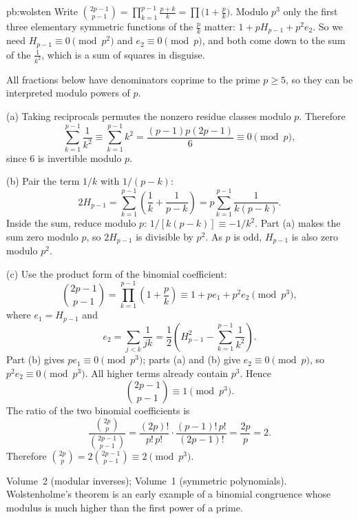 \begin{solution}{pb:wolsten}
\idea Write $\binom{2p-1}{p-1}=\prod_{k=1}^{p-1}\frac{p+k}k=\prod\bigl(1+\frac pk\bigr)$. Modulo $p^3$ only the first three elementary symmetric
functions of the $\frac pk$ matter: $1+pH_{p-1}+p^2e_2$. So we need $H_{p-1}\equiv0\pmod{p^2}$ and $e_2\equiv0\pmod p$, and both come down
to the sum of the $\frac1{k^2}$, which is a sum of squares in disguise.

\writeup All fractions below have denominators coprime to the prime $p\ge5$, so they can be interpreted modulo powers of $p$.

(a) Taking reciprocals permutes the nonzero residue classes modulo $p$. Therefore
\[
\sum_{k=1}^{p-1}\frac1{k^2}
\equiv\sum_{k=1}^{p-1}k^2
=\frac{(p-1)p(2p-1)}6
\equiv0\pmod p,
\]
since $6$ is invertible modulo $p$.

(b) Pair the term $1/k$ with $1/(p-k)$:
\[
2H_{p-1}
=\sum_{k=1}^{p-1}\left(\frac1k+\frac1{p-k}\right)
=p\sum_{k=1}^{p-1}\frac1{k(p-k)}.
\]
Inside the sum, reduce modulo $p$: $1/[k(p-k)]\equiv-1/k^2$. Part (a) makes the sum zero modulo $p$, so $2H_{p-1}$ is divisible by $p^2$. As $p$ is odd, $H_{p-1}$ is also zero modulo $p^2$.

(c) Use the product form of the binomial coefficient:
\[
\binom{2p-1}{p-1}
=\prod_{k=1}^{p-1}\left(1+\frac pk\right)
\equiv1+pe_1+p^2e_2\pmod{p^3},
\]
where $e_1=H_{p-1}$ and
\[
e_2=\sum_{j<k}\frac1{jk}
=\frac12\left(H_{p-1}^2-\sum_{k=1}^{p-1}\frac1{k^2}\right).
\]
Part (b) gives $pe_1\equiv0\pmod{p^3}$; parts (a) and (b) give $e_2\equiv0\pmod p$, so $p^2e_2\equiv0\pmod{p^3}$. All higher terms already contain $p^3$. Hence
\[
\binom{2p-1}{p-1}\equiv1\pmod{p^3}.
\]
The ratio of the two binomial coefficients is
\[
\frac{\binom{2p}{p}}{\binom{2p-1}{p-1}}
=\frac{(2p)!}{p!\,p!}\cdot\frac{(p-1)!\,p!}{(2p-1)!}
=\frac{2p}{p}=2.
\]
Therefore $\binom{2p}{p}=2\binom{2p-1}{p-1}\equiv2\pmod{p^3}$.

\tools Volume~2 (modular inverses); Volume~1 (symmetric polynomials).
\leads Wolstenholme's theorem is an early example of a binomial congruence whose modulus is much higher than the first power of a prime.
\end{solution}

